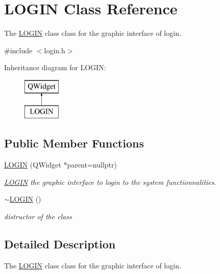 \hypertarget{class_l_o_g_i_n}{}\section{L\+O\+G\+IN Class Reference}
\label{class_l_o_g_i_n}


The \mbox{\hyperlink{class_l_o_g_i_n}{L\+O\+G\+IN}} class class for the graphic interface of login.  




{\ttfamily \#include $<$login.\+h$>$}

Inheritance diagram for L\+O\+G\+IN\+:\begin{figure}[H]
\begin{center}
\leavevmode
\includegraphics[height=2.000000cm]{class_l_o_g_i_n}
\end{center}
\end{figure}
\subsection*{Public Member Functions}
\begin{DoxyCompactItemize}
\item 
\mbox{\hyperlink{class_l_o_g_i_n_ab3dd33ad6b37db3e20251d5e60ac7cd5}{L\+O\+G\+IN}} (Q\+Widget $\ast$parent=nullptr)
\begin{DoxyCompactList}\small\item\em \mbox{\hyperlink{class_l_o_g_i_n}{L\+O\+G\+IN}} the graphic interface to login to the system functionnalities. \end{DoxyCompactList}\item 
\mbox{\label{class_l_o_g_i_n_a0d2bff82e2c35eca7566d8ebd180e70f}} 
\mbox{\hyperlink{class_l_o_g_i_n_a0d2bff82e2c35eca7566d8ebd180e70f}{$\sim$\+L\+O\+G\+IN}} ()
\begin{DoxyCompactList}\small\item\em distructor of the class \end{DoxyCompactList}\end{DoxyCompactItemize}


\subsection{Detailed Description}
The \mbox{\hyperlink{class_l_o_g_i_n}{L\+O\+G\+IN}} class class for the graphic interface of login. 

